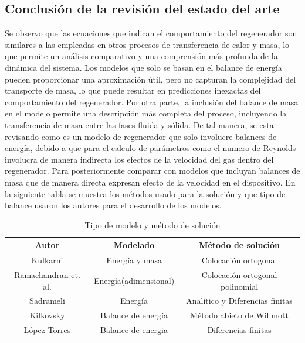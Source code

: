 \documentclass[12pt,letterpaper,final]{article}%
\begin{document}
\subsection{Conclusión de la revisión del estado del arte}

Se observo que las ecuaciones que indican el comportamiento del regenerador son similares a las empleadas en otros procesos de transferencia de calor y masa\cite{Kilkovsky2020}\cite{Kulkarni1992}\cite{SADRAMELI2016}, lo que permite un análisis comparativo y una comprensión más profunda de la dinámica del sistema.
Los modelos que solo se basan en el balance de energía pueden proporcionar una aproximación útil, pero no capturan la complejidad del transporte de masa, lo que puede resultar en predicciones inexactas del comportamiento del regenerador. 
\newline 
Por otra parte, la inclusión del balance de masa en el modelo permite una descripción más completa del proceso, incluyendo la transferencia de masa entre las fases fluida y sólida\cite{Ramachadran1984}. De tal manera, se esta revisando como es un modelo de regenerador que solo involucre balances de energía, debido a que para el calculo de parámetros como el numero de Reynolds involucra de manera indirecta los efectos de la velocidad del gas dentro del regenerador. Para posteriormente comparar con modelos que incluyan balances de masa que de manera directa expresan efecto de la velocidad en el dispositivo.
\newline
En la siguiente tabla se muestra los métodos usado para la solución y que tipo de balance usaron los autores para el desarrollo de los modelos.
\begin{table}[ht]
	\caption{Tipo de modelo y método de solución}
	\begin{center}
		\begin{tabular}{|c|c|c|}
			\hline
			Autor& Modelado & Método de solución\\ \hline
			Kulkarni\cite{Kulkarni1992}& Energía y masa& Colocación ortogonal \\ 
			Ramachandran et. al. \cite{Ramachadran1984} & Energía(adimensional) &Colocación ortogonal polinomial \\
			Sadrameli \cite{SADRAMELI2016}& Energía & Analítico y Diferencias finitas \\
			Kilkovsky \cite{Kilkovsky2020}& Balance de energía & Método abieto de Willmott   \\
			López-Torres \cite{Lopez2013} & Balance de energia & Diferencias finitas \\
			
			\hline
			
			
		\end{tabular}
	\end{center}
\end{table}
\end{document}
